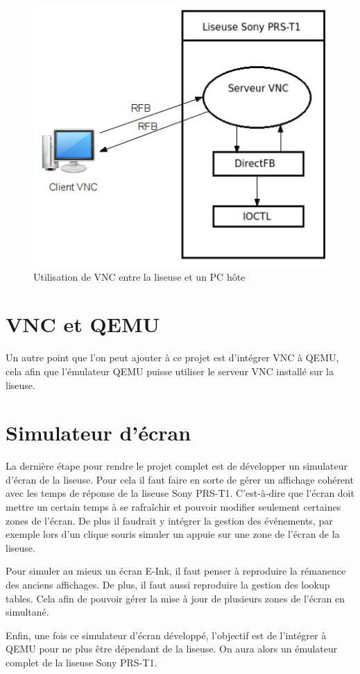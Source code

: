 \begin{figure}[h!]
	\begin{center}
		\includegraphics{VNCClientServeur.png}
		\caption{Utilisation de VNC entre la liseuse et un PC hôte}
	\end{center}
\end{figure}

\section{VNC et QEMU}

Un autre point que l'on peut ajouter à ce projet est d'intégrer VNC à QEMU, cela afin que l'émulateur QEMU puisse utiliser le serveur VNC installé sur la liseuse.


\section{Simulateur d'écran}

La dernière étape pour rendre le projet complet est de développer un simulateur d'écran de la liseuse. Pour cela il faut faire en sorte de gérer un affichage cohérent avec les temps de réponse de la liseuse Sony PRS-T1. C'est-à-dire que l'écran doit mettre un certain temps à se rafraîchir et pouvoir modifier seulement certaines zones de l'écran. De plus il faudrait y intégrer la gestion des événements, par exemple lors d'un clique souris simuler un appuie sur une zone de l'écran de la liseuse.

Pour simuler au mieux un écran E-Ink, il faut penser à reproduire la rémanence des anciens affichages. De plus, il faut aussi reproduire la gestion des lookup tables. Cela afin de pouvoir gérer la mise à jour de plusieurs zones de l'écran en simultané.

Enfin, une fois ce simulateur d'écran développé, l'objectif est de l'intégrer à QEMU pour ne plus être dépendant de la liseuse. On aura alors un émulateur complet de la liseuse Sony PRS-T1.
